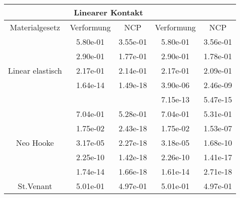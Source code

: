 \begin{table} 
\centering 
\begin{tabular}{c|cc|cc|} 
\cline{2-5} 
 & \multicolumn{2}{|c|}{Linearer Kontakt} &  \\ 
\hline 
\multicolumn{1}{|c|}{Materialgesetz} & \multicolumn{1}{c|}{Verformung} & \multicolumn{1}{c|}{NCP} & \multicolumn{1}{c|}{Verformung} & \multicolumn{1}{c|}{NCP} \\ 
\hline 
\multicolumn{1}{|c|}{\multirow{5}{*}{Linear elastisch}} &\multicolumn{1}{|c|}{  5.80e-01} & \multicolumn{1}{|c|}{  3.55e-01} & \multicolumn{1}{|c|}{  5.80e-01} & \multicolumn{1}{|c|}{  3.56e-01} \\ 
\multicolumn{1}{|c|}{} & \multicolumn{1}{|c|}{  2.90e-01} & \multicolumn{1}{|c|}{  1.77e-01} & \multicolumn{1}{|c|}{  2.90e-01} & \multicolumn{1}{|c|}{  1.78e-01} \\ 
\multicolumn{1}{|c|}{} & \multicolumn{1}{|c|}{  2.17e-01} & \multicolumn{1}{|c|}{  2.14e-01} & \multicolumn{1}{|c|}{  2.17e-01} & \multicolumn{1}{|c|}{  2.09e-01} \\ 
\multicolumn{1}{|c|}{} & \multicolumn{1}{|c|}{  1.64e-14} & \multicolumn{1}{|c|}{  1.49e-18} & \multicolumn{1}{|c|}{  3.90e-06} & \multicolumn{1}{|c|}{  2.46e-09} \\ 
\multicolumn{1}{|c|}{} & \multicolumn{1}{|c|}{} & \multicolumn{1}{|c|}{} & \multicolumn{1}{|c|}{  7.15e-13} & \multicolumn{1}{|c|}{  5.47e-15} \\ 
\hline 
\multicolumn{1}{|c|}{\multirow{5}{*}{Neo Hooke}} &\multicolumn{1}{|c|}{  7.04e-01} & \multicolumn{1}{|c|}{  5.28e-01} & \multicolumn{1}{|c|}{  7.04e-01} & \multicolumn{1}{|c|}{  5.31e-01} \\ 
\multicolumn{1}{|c|}{} & \multicolumn{1}{|c|}{  1.75e-02} & \multicolumn{1}{|c|}{  2.43e-18} & \multicolumn{1}{|c|}{  1.75e-02} & \multicolumn{1}{|c|}{  1.53e-07} \\ 
\multicolumn{1}{|c|}{} & \multicolumn{1}{|c|}{  3.17e-05} & \multicolumn{1}{|c|}{  2.27e-18} & \multicolumn{1}{|c|}{  3.18e-05} & \multicolumn{1}{|c|}{  1.68e-10} \\ 
\multicolumn{1}{|c|}{} & \multicolumn{1}{|c|}{  2.25e-10} & \multicolumn{1}{|c|}{  1.42e-18} & \multicolumn{1}{|c|}{  2.26e-10} & \multicolumn{1}{|c|}{  1.41e-17} \\ 
\multicolumn{1}{|c|}{} & \multicolumn{1}{|c|}{  1.74e-14} & \multicolumn{1}{|c|}{  1.66e-18} & \multicolumn{1}{|c|}{  1.61e-14} & \multicolumn{1}{|c|}{  2.71e-18} \\ 
\hline 
\multicolumn{1}{|c|}{\multirow{5}{*}{St.Venant}} &\multicolumn{1}{|c|}{  5.01e-01} & \multicolumn{1}{|c|}{  4.97e-01} & \multicolumn{1}{|c|}{  5.01e-01} & \multicolumn{1}{|c|}{  4.97e-01} \\ 

\end{tabular}
\end{table}

